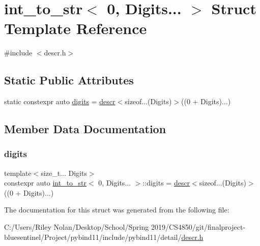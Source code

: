 \hypertarget{structint__to__str_3_010_00_01_digits_8_8_8_01_4}{}\section{int\+\_\+to\+\_\+str$<$ 0, Digits... $>$ Struct Template Reference}
\label{structint__to__str_3_010_00_01_digits_8_8_8_01_4}


{\ttfamily \#include $<$descr.\+h$>$}

\subsection*{Static Public Attributes}
\begin{DoxyCompactItemize}
\item 
static constexpr auto \mbox{\hyperlink{structint__to__str_3_010_00_01_digits_8_8_8_01_4_a5f113ffa80aabd86e98e40ee8518b1da}{digits}} = \mbox{\hyperlink{structdescr}{descr}}$<$sizeof...(Digits)$>$((\textquotesingle{}0\textquotesingle{} + Digits)...)
\end{DoxyCompactItemize}


\subsection{Member Data Documentation}
\mbox{\label{structint__to__str_3_010_00_01_digits_8_8_8_01_4_a5f113ffa80aabd86e98e40ee8518b1da}} 
\subsubsection{\texorpdfstring{digits}{digits}}
{\footnotesize\ttfamily template$<$size\+\_\+t... Digits$>$ \\
constexpr auto \mbox{\hyperlink{structint__to__str}{int\+\_\+to\+\_\+str}}$<$ 0, Digits... $>$\+::digits = \mbox{\hyperlink{structdescr}{descr}}$<$sizeof...(Digits)$>$((\textquotesingle{}0\textquotesingle{} + Digits)...)\hspace{0.3cm}{\ttfamily [static]}}



The documentation for this struct was generated from the following file\+:\begin{DoxyCompactItemize}
\item 
C\+:/\+Users/\+Riley Nolan/\+Desktop/\+School/\+Spring 2019/\+C\+S4850/git/finalproject-\/bluesentinel/\+Project/pybind11/include/pybind11/detail/\mbox{\hyperlink{descr_8h}{descr.\+h}}\end{DoxyCompactItemize}
